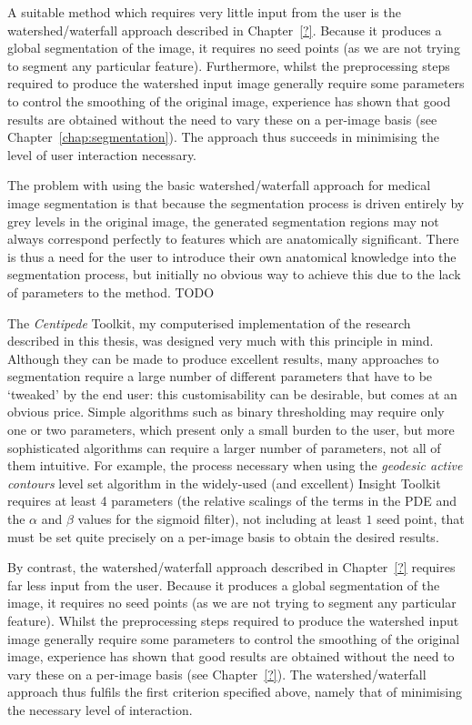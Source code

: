A suitable method which requires very little input from the user is the watershed/waterfall approach \cite{?} described in Chapter~\ref{?}. Because it produces a global segmentation of the image, it requires no seed points (as we are not trying to segment any particular feature). Furthermore, whilst the preprocessing steps required to produce the watershed input image generally require some parameters to control the smoothing of the original image, experience has shown that good results are obtained without the need to vary these on a per-image basis (see Chapter~\ref{chap:segmentation}). The approach thus succeeds in minimising the level of user interaction necessary.

The problem with using the basic watershed/waterfall approach for medical image segmentation is that because the segmentation process is driven entirely by grey levels in the original image, the generated segmentation regions may not always correspond perfectly to features which are anatomically significant. There is thus a need for the user to introduce their own anatomical knowledge into the segmentation process, but initially no obvious way to achieve this due to the lack of parameters to the method. TODO

\iffalse

The \emph{Centipede} Toolkit, my computerised implementation of the research described in this thesis, was designed very much with this principle in mind. Although they can be made to produce excellent results, many approaches to segmentation require a large number of different parameters that have to be `tweaked' by the end user: this customisability can be desirable, but comes at an obvious price. Simple algorithms such as binary thresholding may require only one or two parameters, which present only a small burden to the user, but more sophisticated algorithms can require a larger number of parameters, not all of them intuitive. For example, the process necessary when using the \emph{geodesic active contours} level set algorithm in the widely-used (and excellent) Insight Toolkit \cite{?} requires at least 4 parameters (the relative scalings of the terms in the PDE  and the $\alpha$ and $\beta$ values for the sigmoid filter), not including at least $1$ seed point, that must be set quite precisely on a per-image basis to obtain the desired results.

By contrast, the watershed/waterfall approach \cite{?} described in Chapter~\ref{?} requires far less input from the user. Because it produces a global segmentation of the image, it requires no seed points (as we are not trying to segment any particular feature). Whilst the preprocessing steps required to produce the watershed input image generally require some parameters to control the smoothing of the original image, experience has shown that good results are obtained without the need to vary these on a per-image basis (see Chapter~\ref{?}). The watershed/waterfall approach thus fulfils the first criterion specified above, namely that of minimising the necessary level of interaction.

